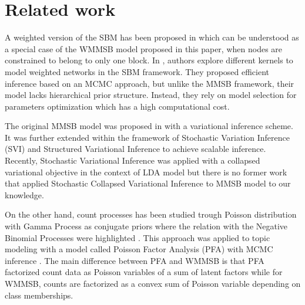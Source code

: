 \section{Related work}
\label{sec:rl}



A weighted version of the SBM has been proposed in \cite{aicher2014learning} which can be understood as a special case of the WMMSB model proposed in this paper, when nodes are constrained to belong to only one block. In \cite{peixoto2018nonparametric}, authors explore different kernels to model weighted networks in the SBM framework. They proposed efficient inference based on an MCMC approach, but unlike the MMSB framework, their model lacks hierarchical prior structure. Instead, they rely on model selection for parameters optimization which has a high computational cost.

The original MMSB model was proposed in \cite{airoldi2009mixed} with a variational inference scheme. It was further extended within the framework of Stochastic Variation Inference (SVI) \cite{gopalan2013efficient} and Structured Variational Inference \cite{kim2013efficient} to achieve scalable inference. Recently, Stochastic Variational Inference was applied with a collapsed variational objective in the context of LDA model \cite{foulds2013stochastic} but there is no former work that applied Stochastic Collapsed Variational Inference to MMSB model to our knowledge.

On the other hand, count processes has been studied trough Poisson distribution with Gamma Process as conjugate priors where the relation with the Negative Binomial Processes were highlighted \cite{zhou2012augment} \cite{zhou2015negative}. This approach was applied to topic modeling with a model called Poisson Factor Analysis (PFA) with MCMC inference \cite{zhou2012beta}. The main difference between PFA and WMMSB is that PFA factorized count data as Poisson variables of a sum of latent factors while for WMMSB, counts are factorized as a convex sum of Poisson variable depending on class memberships.





